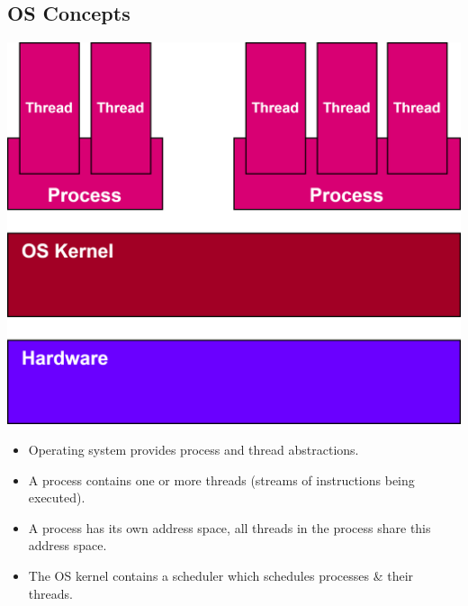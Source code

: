 \subsection{OS Concepts}
\begin{minipage}{.3\textwidth}
    \includegraphics[width=\textwidth]{introduction/images/os_stack.drawio.png}    
\end{minipage}
\hfill
\begin{minipage}{.68\textwidth}
    \begin{itemize}
        \item Operating system provides process and thread abstractions.
        \item A process contains one or more threads (streams of instructions being executed).
        \item A process has its own address space, all threads in the process share this address space.
        \item The OS kernel contains a scheduler which schedules processes \& their threads.
    \end{itemize}
\end{minipage}

